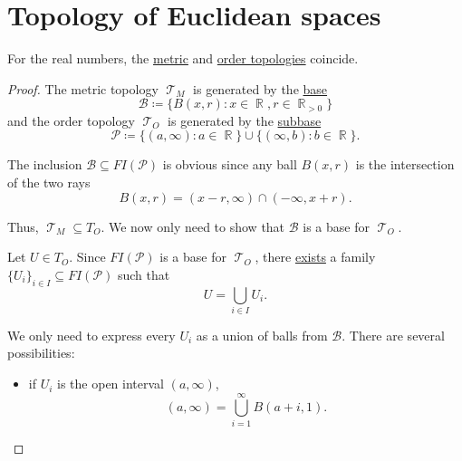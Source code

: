 \section{Topology of Euclidean spaces}\label{sec:topology_of_euclidean_spaces}

\begin{theorem}\label{thm:real_metric_and_order_topologies_coincide}
  For the real numbers, the \hyperref[def:metric_topology]{metric} and \hyperref[def:order_topology]{order topologies} coincide.
\end{theorem}
\begin{proof}
  The metric topology \( \mscrT_M \) is generated by the \hyperref[def:topological_base]{base}
  \begin{equation*}
    \mathcal{B} \coloneqq \{ B(x, r) \colon x \in \BbbR, r \in \BbbR_{>0} \}
  \end{equation*}
  and the order topology \( \mscrT_O \) is generated by the \hyperref[def:topological_subbase]{subbase}
  \begin{equation*}
    \mathcal{P} \coloneqq \{ (a, \infty) \colon a \in \BbbR \} \cup \{ (\infty, b) \colon b \in \BbbR \}.
  \end{equation*}

  The inclusion \( \mathcal{B} \subseteq FI(\mathcal{P}) \) is obvious since any ball \( B(x, r) \) is the intersection of the two rays
  \begin{equation*}
    B(x, r) = (x - r, \infty) \cap (-\infty, x + r).
  \end{equation*}

  Thus, \( \mscrT_M \subseteq T_O \). We now only need to show that \( \mathcal{B} \) is a base for \( \mscrT_O \).

  Let \( U \in T_O \). Since \( FI(\mathcal{P}) \) is a base for \( \mscrT_O \), there \hyperref[def:topological_base/union]{exists} a family \( \{ U_i \}_{i \in I} \subseteq FI(\mathcal{P}) \) such that
  \begin{equation*}
    U = \bigcup_{i \in I} U_i.
  \end{equation*}

  We only need to express every \( U_i \) as a union of balls from \( \mathcal{B} \). There are several possibilities:
  \begin{itemize}
    \item if \( U_i \) is the open interval \( (a, \infty) \),
          \begin{equation*}
            (a, \infty) = \bigcup_{i=1}^\infty B(a + i, 1).
          \end{equation*}


\end{itemize}
\end{proof}
